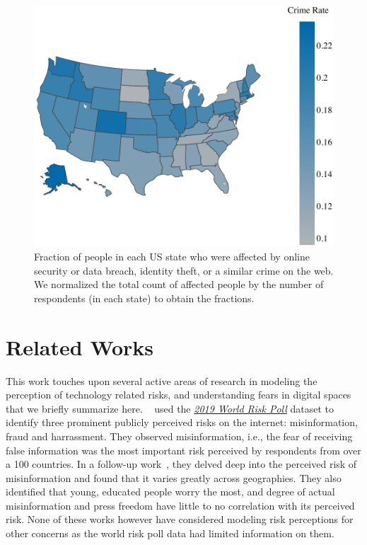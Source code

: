 \documentclass{article}
\theoremstyle{plain}
\theoremstyle{definition}
\theoremstyle{remark}
\begin{document}
\begin{figure}[t!]
\includegraphics[width=\linewidth]{tex/figures/statewise_distribution.pdf}
\caption{Fraction of people in each US state who were affected by 
online security or data breach, identity theft, or a similar crime on the web. We normalized the total count of affected people by the number of respondents (in each state) to obtain the fractions.}
\label{fig:statewise_distribution}
\end{figure}

\section{Related Works}
This work touches upon several active areas of research in modeling the perception of technology related risks, and understanding fears in digital spaces that we briefly summarize here. ~\citet{knuutila2020global} used the \emph{\href{https://wrp.lrfoundation.org.uk/data-resources/}{2019 World Risk Poll}} dataset to identify three prominent publicly perceived risks on the internet: misinformation, fraud and harrassment. They observed misinformation, i.e., the fear of receiving false information was the most important risk perceived by respondents from over a 100 countries. In a follow-up work~\citep{knuutilaafraid}, they delved deep into the perceived risk of misinformation and found that it varies greatly across geographies.
They also identified that young, educated people worry the most, and degree of actual misinformation and press freedom have little to no correlation with its perceived risk.
None of these works however have considered modeling risk perceptions for other concerns as the world risk poll data had limited information on them.
\end{document}
